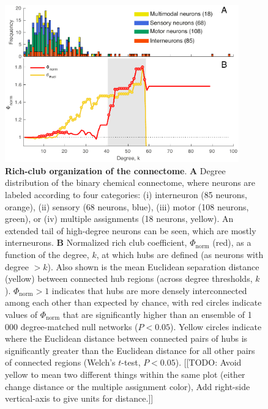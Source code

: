 \documentclass[10pt,letterpaper]{article}
\begin{document}
\begin{figure}[h]
   \centering
    \includegraphics[width=0.9\textwidth]{topology_rich.pdf}
 \caption{\textbf{Rich-club organization of the connectome}.
\textbf{A} Degree distribution of the binary chemical connectome, where neurons are labeled according to four categories:
(i) interneuron (85 neurons, orange),
(ii) sensory (68 neurons, blue),
(iii) motor (108 neurons, green), or
(iv) multiple assignments (18 neurons, yellow).
An extended tail of high-degree neurons can be seen, which are mostly interneurons.
\textbf{B}
Normalized rich club coefficient, $\Phi_\mathrm{norm}$ (red), as a function of the degree, $k$, at which hubs are defined (as neurons with degree $>k$).
Also shown is the mean Euclidean separation distance (yellow) between connected hub regions (across degree thresholds, $k$).
$\Phi_\mathrm{norm} > 1$ indicates that hubs are more densely interconnected among each other than expected by chance, with red circles indicate values of $\Phi_\mathrm{norm}$ that are significantly higher than an ensemble of 1\,000 degree-matched null networks ($P < 0.05$).
Yellow circles indicate where the Euclidean distance between connected pairs of hubs is significantly greater than the Euclidean distance for all other pairs of connected regions (Welch's $t$-test, $P < 0.05$).
[[TODO: Avoid yellow to mean two different things within the same plot (either change distance or the multiple assignment color), Add right-side vertical-axis to give units for distance.]]
}
 \label{fig:topology_rich}
 \end{figure}
\end{document}
